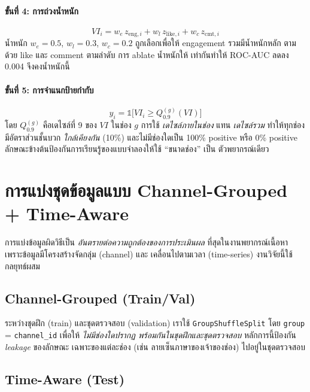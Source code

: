 \paragraph{ขั้นที่ 4: การถ่วงน้ำหนัก}
\begin{equation}
\mathit{VI}_i = w_e\,z_{\text{eng},i} + w_l\,z_{\text{like},i} + w_c\,z_{\text{cmt},i}
\label{eq:vi}
\end{equation}
น้ำหนัก $w_e = 0.5$, $w_l = 0.3$, $w_c = 0.2$ ถูกเลือกเพื่อให้ engagement
รวมมีน้ำหนักหลัก ตามด้วย like และ comment ตามลำดับ การ ablate น้ำหนักให้
เท่ากันทำให้ ROC-AUC ลดลง 0.004 จึงคงน้ำหนักนี้

\paragraph{ขั้นที่ 5: การจำแนกป้ายกำกับ}
\begin{equation}
y_i = \mathbb{1}\!\bigl[\mathit{VI}_i \geq Q_{0.9}^{(g)}(\mathit{VI})\bigr]
\label{eq:label}
\end{equation}
โดย $Q_{0.9}^{(g)}$ คือเดไซล์ที่ 9 ของ $\mathit{VI}$ ในช่อง $g$ การใช้
\emph{เดไซล์ภายในช่อง} แทน \emph{เดไซล์รวม} ทำให้ทุกช่องมีอัตราส่วนชั้นบวก
\emph{ใกล้เคียงกัน} (10\%) และไม่มีช่องใดเป็น 100\% positive หรือ 0\%
positive ลักษณะข้างต้นป้องกันการเรียนรู้ของแบบจำลองให้ใช้ ``ขนาดช่อง'' เป็น
ตัวพยากรณ์เดียว

\section{การแบ่งชุดข้อมูลแบบ Channel-Grouped + Time-Aware}
\label{sec:method-split}

การแบ่งข้อมูลผิดวิธีเป็น \emph{อันตรายต่อความถูกต้องของการประเมินผล}
ที่สุดในงานพยากรณ์เนื้อหา เพราะข้อมูลมีโครงสร้างจัดกลุ่ม (channel) และ
เคลื่อนไปตามเวลา (time-series) งานวิจัยนี้ใช้กลยุทธ์ผสม

\subsection{Channel-Grouped (Train/Val)}

ระหว่างชุดฝึก (train) และชุดตรวจสอบ (validation) เราใช้ \texttt{GroupShuffleSplit}
โดย \texttt{group} = \texttt{channel\_id} เพื่อให้ \emph{ไม่มีช่องใดปรากฏ
พร้อมกันในชุดฝึกและชุดตรวจสอบ} หลักการนี้ป้องกัน \emph{leakage} ของลักษณะ
เฉพาะของแต่ละช่อง (เช่น ลายเซ็นภาษาของเจ้าของช่อง) ไปอยู่ในชุดตรวจสอบ

\subsection{Time-Aware (Test)}

